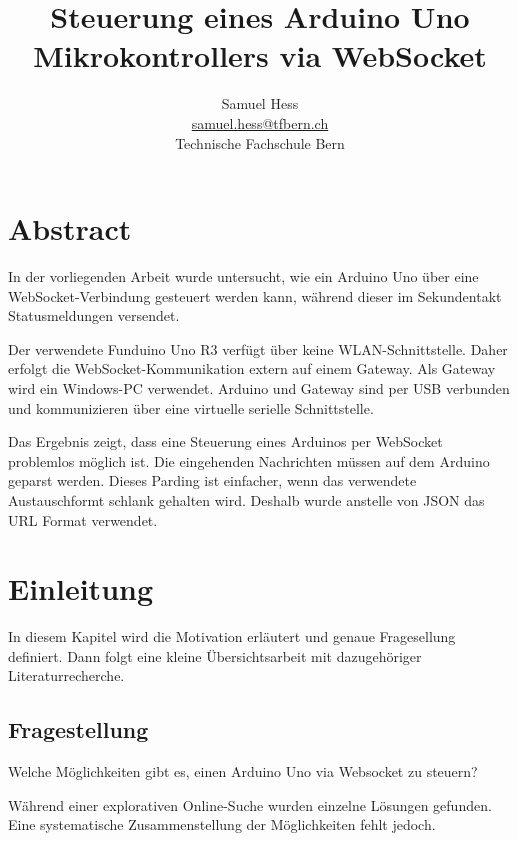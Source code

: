 
\subject{ICT Modul 121 -- Steuerungsaufgaben bearbeiten}
\title{Steuerung eines Arduino Uno Mikrokontrollers via WebSocket}
\subtitle{}
\author{Samuel Hess \\ 
\href{mailto:samuel.hess@tfbern.ch}{samuel.hess@tfbern.ch} \\ 
Technische Fachschule Bern}


\maketitle

\newpage
\tableofcontents
\newpage

\section{Abstract}
In der vorliegenden Arbeit wurde untersucht, wie ein Arduino Uno über eine WebSocket-Verbindung gesteuert werden kann, während dieser im Sekundentakt Statusmeldungen versendet.

Der verwendete Funduino Uno R3\cite{lernset} verfügt über keine WLAN-Schnittstelle. Daher erfolgt die WebSocket-Kommunikation extern auf einem Gateway. Als Gateway wird ein Windows-PC verwendet. Arduino und Gateway sind per USB verbunden und kommunizieren über eine virtuelle serielle
Schnittstelle.

Das Ergebnis zeigt, dass eine Steuerung eines Arduinos per WebSocket problemlos möglich ist.  Die eingehenden Nachrichten müssen auf dem Arduino geparst werden. Dieses Parding ist einfacher, wenn das verwendete Austauschformt schlank gehalten wird. Deshalb wurde anstelle von JSON das URL Format verwendet.

\section{Einleitung}
In diesem Kapitel wird die Motivation erläutert und genaue Fragesellung definiert. Dann folgt eine kleine Übersichtsarbeit mit dazugehöriger Literaturrecherche.  

\subsection{Fragestellung}
Welche Möglichkeiten gibt es, einen Arduino Uno via Websocket zu steuern?

Während einer explorativen Online-Suche wurden einzelne Lösungen gefunden. Eine systematische Zusammenstellung der Möglichkeiten fehlt jedoch.

